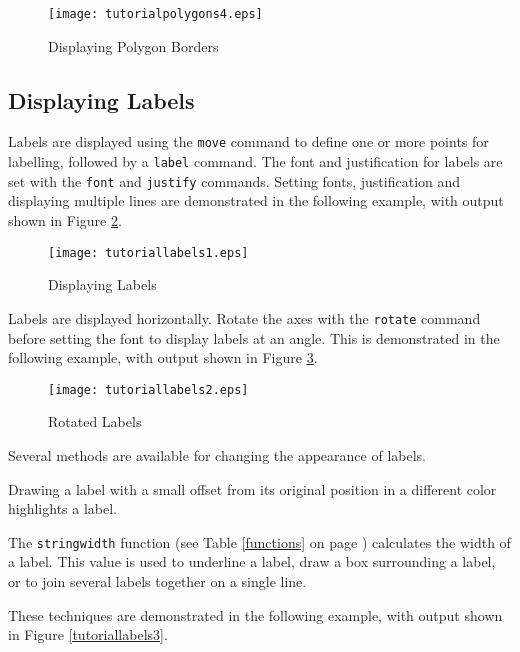 

\begin{figure}[htb]
\texttt{[image: tutorialpolygons4.eps]}
\caption{Displaying Polygon Borders}
\label{tutorialpolygons4}
\end{figure}

\subsection{Displaying Labels}

Labels are displayed using the \texttt{move}
command to define one or more points for labelling, followed by a
\texttt{label} command.  The font and justification for labels
are set with the \texttt{font} and \texttt{justify} commands.
Setting fonts, justification and displaying multiple lines
are demonstrated in the following example, with output
shown in Figure \ref{tutoriallabels1}.



\begin{figure}[htb]
\texttt{[image: tutoriallabels1.eps]}
\caption{Displaying Labels}
\label{tutoriallabels1}
\end{figure}

Labels are displayed horizontally.  Rotate the axes with the \texttt{rotate}
command before setting the font to display labels at an angle.
This is demonstrated in the following example,
with output shown in Figure \ref{tutoriallabels2}.



\begin{figure}[htb]
\texttt{[image: tutoriallabels2.eps]}
\caption{Rotated Labels}
\label{tutoriallabels2}
\end{figure}

Several methods are available for changing the appearance of labels.

Drawing a label with a small offset from its original position in a different
color highlights a label.

The \texttt{stringwidth} function (see Table \ref{functions}
on page \pageref{functions}) calculates the
width of a label.  This value is used to underline a label, draw a box
surrounding a label, or to join several labels together on a single line.

These techniques are demonstrated in the following example,
with output shown in Figure \ref{tutoriallabels3}.


